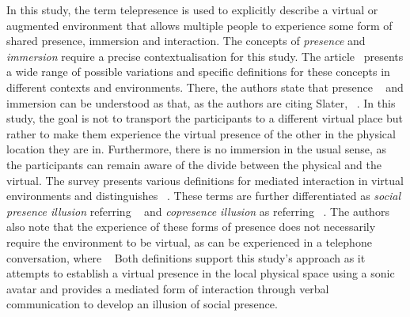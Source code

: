 In this study, the term telepresence is used to explicitly describe a virtual or augmented environment that allows multiple people to experience some form of shared presence, immersion and interaction.
The concepts of \emph{presence} and \emph{immersion} require a precise contextualisation for this study.
The article~ presents a wide range of possible variations and specific definitions for these concepts in different contexts and environments.
There, the authors state that presence ~\parencite[2]{surveyOfPresence} and immersion can be understood as  that, as the authors are citing Slater, ~\parencite[3]{surveyOfPresence}.
In this study, the goal is not to transport the participants to a different virtual place but rather to make them experience the virtual presence of the other in the physical location they are in.
Furthermore, there is no immersion in the usual sense, as the participants can remain aware of the divide between the physical and the virtual.
The survey presents various definitions for mediated interaction in virtual environments and distinguishes ~\parencite[4]{surveyOfPresence}.
These terms are further differentiated as \emph{social presence illusion} referring ~\parencite[4]{surveyOfPresence} and \emph{copresence illusion} as referring ~\parencite[5]{surveyOfPresence}.
The authors also note that the experience of these forms of presence does not necessarily require the environment to be virtual, as can be experienced in a telephone conversation, where ~\parencite[5]{surveyOfPresence}
Both definitions support this study's approach as it attempts to establish a virtual presence in the local physical space using a sonic avatar and provides a mediated form of interaction through verbal communication to develop an illusion of social presence.

